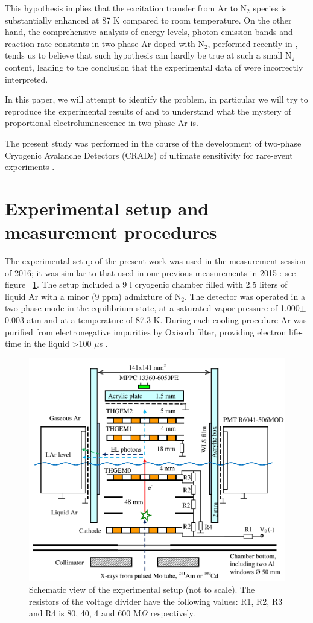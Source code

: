 \documentclass[a4paper,11pt]{article}
\begin{document}
This hypothesis implies that the excitation transfer from Ar to N$_2$ species is substantially enhanced at 87 K compared to room temperature. On the other hand, the comprehensive analysis of energy levels, photon emission bands and reaction rate constants in two-phase Ar doped with N$_2$, performed recently in \cite{ArXeN2Proc17}, tends us to believe that such hypothesis can hardly be true at such a small N$_2$ content, leading to the conclusion that the experimental data of \cite{CRADPropEL15} were incorrectly interpreted.

In this paper, we will attempt to identify the problem, in particular we will try to reproduce the experimental results of \cite{CRADPropEL15} and to understand what the mystery of proportional electroluminescence in two-phase Ar is.

The present study was performed in the course of the development of two-phase Cryogenic Avalanche Detectors (CRADs) of ultimate sensitivity for rare-event experiments \cite{CRADRev12,CRADProject12,IonYield14,CryoMPPC15,CryoPMT15,XRayYield16,CryoPMT17}.

\section{Experimental setup and measurement procedures}

The experimental setup of the present work was used in the measurement session of 2016; it was similar to that used in our previous measurements in 2015 \cite{CRADPropEL15,CRADELGap17}: see figure ~\ref{Setup}. The setup included a 9 l cryogenic chamber filled with 2.5 liters of liquid Ar with a minor (9 ppm) admixture of N$_2$. The detector was operated in a two-phase mode in the equilibrium state, at a saturated vapor pressure of 1.000$\pm$0.003 atm and at a temperature of 87.3 K. During each cooling procedure Ar was purified from electronegative impurities by Oxisorb filter, providing electron life-time in the liquid >100 $\mu$s \cite{CRADELGap17}.

\begin{figure}[ht]
	\centering
	\includegraphics[width=0.6\columnwidth,keepaspectratio]{fig1}
	\caption{Schematic view of the experimental setup (not to scale). The resistors of the voltage divider have the following values: R1, R2, R3 and R4 is 80, 40, 4 and 600 M$\Omega$ respectively.}
	\label{Setup}
\end{figure}
\end{document}
